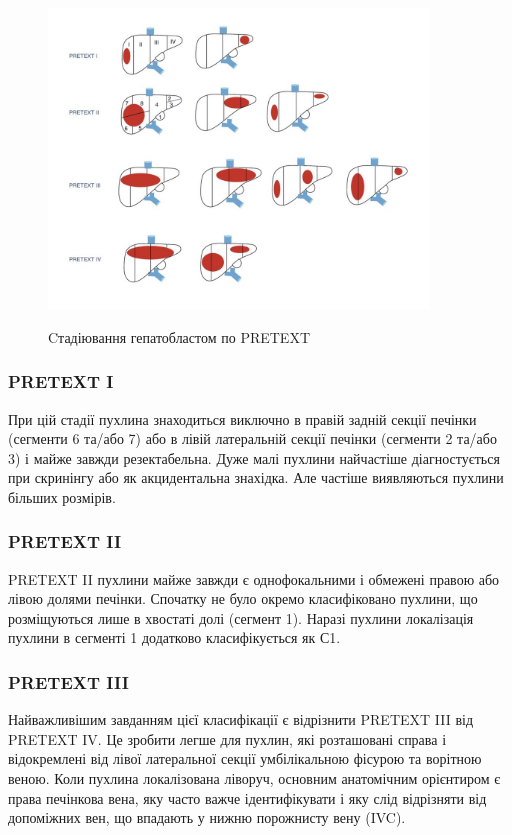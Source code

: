 \begin{figure}[h]
\centering
\includegraphics[width=0.9\textwidth]{Illustrations/pretexmal.jpg}
\label{fig:pretexmal} %
\caption{Cтадіювання гепатобластом по PRETEXT}
\end{figure}

\subsubsection{PRETEXT I}
При цій стадії пухлина знаходиться виключно в правій задній секції печінки (сегменти 6 та/або 7)  або в лівій латеральній секції печінки (сегменти 2 та/або 3) і майже завжди резектабельна. Дуже малі пухлини найчастіше діагностується при скринінгу або як акцидентальна знахідка. Але частіше виявляються пухлини більших розмірів. 
\subsubsection{PRETEXT II}
PRETEXT II  пухлини майже завжди є однофокальними і обмежені правою або лівою долями печінки. Спочатку не було окремо класифіковано пухлини, що розміщуються лише в хвостаті долі (сегмент 1). Наразі пухлини локалізація пухлини в сегменті 1 додатково класифікується як С1.
\subsubsection{PRETEXT III}
Найважливішим завданням цієї класифікації є відрізнити PRETEXT III від PRETEXT IV. Це зробити легше для пухлин, які розташовані справа і відокремлені від лівої латеральної секції умбілікальною фісурою та ворітною веною. Коли пухлина локалізована ліворуч, основним анатомічним орієнтиром є права печінкова вена, яку часто важче ідентифікувати і яку слід відрізняти від допоміжних вен, що впадають у нижню порожнисту вену (IVC).
